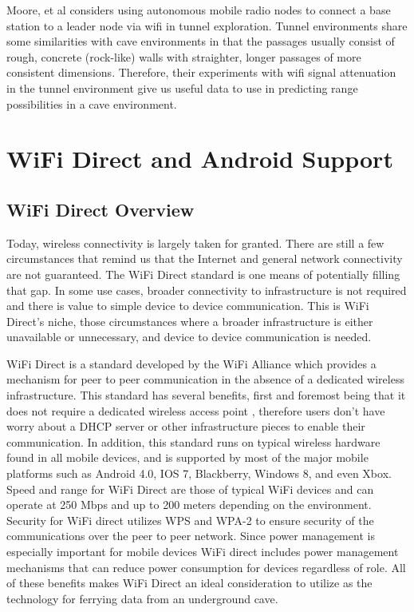 \documentclass[10pt,twocolumn]{article}
\begin{document}
Moore, et al \cite{moore2012} considers using autonomous mobile radio nodes to connect a base station to a leader node via wifi in tunnel exploration. 
Tunnel environments share some similarities with cave environments in that the passages usually consist of rough, concrete (rock-like) walls with straighter, longer passages of more consistent dimensions. 
Therefore, their experiments with wifi signal attenuation in the tunnel environment give us useful data to use in predicting range possibilities in a cave environment.

\section{WiFi Direct and Android Support}

\subsection{WiFi Direct Overview}
\label{sec:WifiD Overview}
Today, wireless connectivity is largely taken for granted. 
There are still a few circumstances that remind us that the Internet and general network connectivity are not guaranteed. 
The WiFi Direct standard is one means of potentially filling that gap. 
In some use cases, broader connectivity to infrastructure is not required and there is value to simple device to device communication. 
This is WiFi Direct's niche, those circumstances where a broader infrastructure is either unavailable or unnecessary, and device to device communication is needed.

WiFi Direct is a standard developed by the WiFi Alliance which provides a mechanism for peer to peer communication in the absence of a dedicated wireless infrastructure. 
This standard has several benefits, first and foremost being that it does not require a dedicated wireless access point \cite{whywifid}
, therefore users don't have worry about a DHCP server or other infrastructure pieces to enable their communication. 
In addition, this standard runs on typical wireless hardware found in all mobile devices, and is supported by most of the major mobile platforms such as Android 4.0, IOS 7, Blackberry, Windows 8, and even Xbox. 
Speed and range for WiFi Direct are those of typical WiFi devices and can operate at 250 Mbps and up to 200 meters depending on the environment. 
Security for WiFi direct utilizes WPS and WPA-2 to ensure security of the communications over the peer to peer network. 
Since power management is especially important for mobile devices WiFi direct includes power management mechanisms that can reduce power consumption for devices regardless of role.
All of these benefits makes WiFi Direct an ideal consideration to utilize as the technology for ferrying data from an underground cave.
\end{document}
